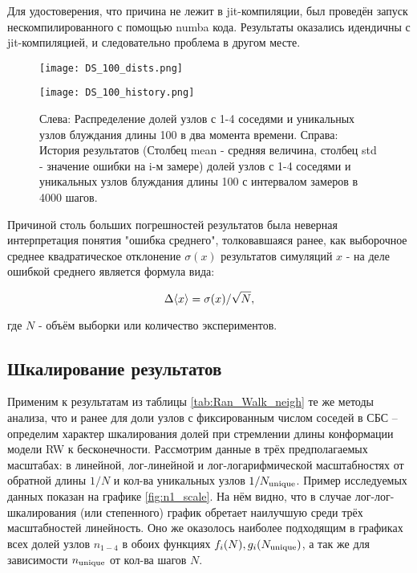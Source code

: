 Для удостоверения, что причина не лежит в jit-компиляции, был проведён запуск нескомпилированного с помощью numba кода. Результаты оказались идендичны с jit-компиляцией, и следовательно проблема в другом месте.

\begin{figure}
	\caption{Слева: Распределение долей узлов с 1-4 соседями и уникальных узлов блуждания длины 100 в два момента времени. Справа: История результатов (Столбец mean - средняя величина, столбец std - значение ошибки на i-м замере) долей узлов с 1-4 соседями и уникальных узлов блуждания длины 100 с интервалом замеров в 4000 шагов.}
     \label{fig:DS_100_dists_history}
\begin{minipage}{0.32\textwidth}
     \texttt{[image: DS\_100\_dists.png]}
\end{minipage}
\begin{minipage}{0.67\textwidth}
     \texttt{[image: DS\_100\_history.png]}
\end{minipage}
	
\end{figure}


Причиной столь больших погрешностей результатов была неверная интерпретация понятия "ошибка среднего", толковавшаяся ранее, как выборочное среднее квадратическое отклонение $\sigma(x)$ результатов симуляций $x$ - на деле ошибкой среднего является формула вида:

\[\Delta\langle x \rangle = \sigma(x)/\sqrt{N},\]

где  $N$ - объём выборки или количество экспериментов.


\subsection{Шкалирование результатов} \label{sec:ni_scale}

Применим к результатам из таблицы \ref{tab:Ran_Walk_neigh} те же методы анализа, что и ранее для доли узлов с фиксированным числом соседей в СБС -- определим характер шкалирования долей при стремлении длины конформации модели RW к бесконечности.
Рассмотрим данные в трёх предполагаемых масштабах: в линейной, лог-линейной и лог-логарифмической масштабностях от обратной длины $1/N$ и кол-ва уникальных узлов $1/N_{\textup{unique}}$.
Пример исследуемых данных показан на графике \ref{fig:n1_scale}. 
На нём видно, что в случае лог-лог-шкалирования (или степенного) график обретает наилучшую среди трёх масштабностей линейность.
Оно же оказолось наиболее подходящим в графиках всех долей узлов $n_{1-4}$ в обоих функциях $f_i(N), g_i(N_{\textup{unique}})$, а так же для зависимости $n_{\textup{unique}}$ от кол-ва шагов $N$.

